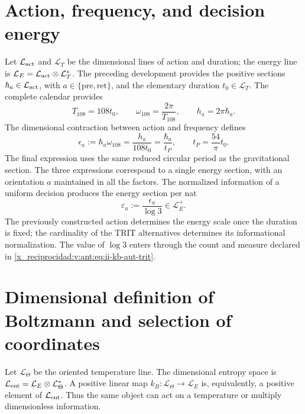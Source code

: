 \section{Action, frequency, and decision energy}

Let \(\mathcal L_{\rm act}\) and \(\mathcal L_T\) be the dimensional
lines of action and duration; the energy line is
\(\mathcal L_E=\mathcal L_{\rm act}\otimes\mathcal L_T^*\).
The preceding development provides the positive sections
\(\hbar_a\in\mathcal L_{\rm act}\), with
\(a\in\{\mathrm{pre},\mathrm{ret}\}\), and the elementary duration
\(t_0\in\mathcal L_T\). The complete calendar provides
\[
 T_{108}=108t_0,\qquad
 \omega_{108}=\frac{2\pi}{T_{108}},\qquad
 h_a=2\pi\hbar_a.
\]
The dimensional contraction between action and frequency defines
\begin{equation}
 \epsilon_a:=\hbar_a\omega_{108}
 =\frac{h_a}{108t_0}
 =\frac{\hbar_a}{t_P},\qquad
 t_P=\frac{54}{\pi}t_0.
 \label{x_reciprocidad:v:ant:eq:ii-kb-aut-energia}
\end{equation}
The final expression uses the same reduced circular period as the
gravitational section. The three expressions correspond to a single
energy section, with an orientation \(a\) maintained in all
the factors. The normalized information of a uniform decision
produces the energy section per nat
\begin{equation}
 \varepsilon_a:=\frac{\epsilon_a}{\log3}\in\mathcal L_E^+.
 \label{x_reciprocidad:v:ant:eq:ii-kb-aut-energia-nat}
\end{equation}
The previously constructed action determines the energy scale once
the duration is fixed; the cardinality of the TRIT alternatives determines its
informational normalization. The value of \(\log3\) enters through the
count and measure declared in \eqref{x_reciprocidad:v:ant:eq:ii-kb-aut-trit}.

\section{Dimensional definition of Boltzmann and selection of coordinates}

Let \(\mathcal L_\Theta\) be the oriented temperature line.
The dimensional entropy space is
\(\mathcal L_{\rm ent}=\mathcal L_E\otimes\mathcal L_\Theta^*\).
A positive linear map
\(k_B:\mathcal L_\Theta\to\mathcal L_E\) is, equivalently,
a positive element of \(\mathcal L_{\rm ent}\). Thus the same
object can act on a temperature or multiply dimensionless
information.

